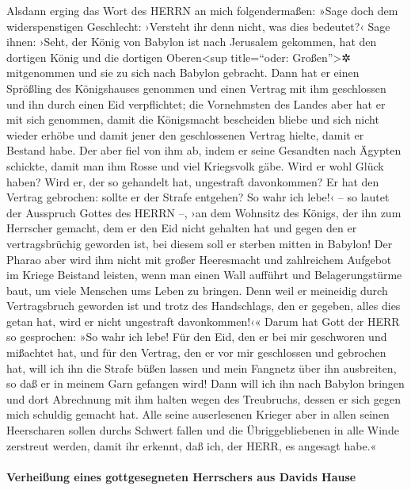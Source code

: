 Alsdann erging das Wort des HERRN an mich folgendermaßen:
»Sage doch dem widerspenstigen Geschlecht: ›Versteht ihr
denn nicht, was dies bedeutet?‹ Sage ihnen: ›Seht, der König von Babylon
ist nach Jerusalem gekommen, hat den dortigen König und die dortigen
Oberen\textless sup title=``oder: Großen''\textgreater✲ mitgenommen und
sie zu sich nach Babylon gebracht. Dann hat er einen
Sprößling des Königshauses genommen und einen Vertrag mit ihm
geschlossen und ihn durch einen Eid verpflichtet; die Vornehmsten des
Landes aber hat er mit sich genommen, damit die
Königsmacht bescheiden bliebe und sich nicht wieder erhöbe und damit
jener den geschlossenen Vertrag hielte, damit er Bestand habe.
Der aber fiel von ihm ab, indem er seine Gesandten nach
Ägypten schickte, damit man ihm Rosse und viel Kriegsvolk gäbe. Wird er
wohl Glück haben? Wird er, der so gehandelt hat, ungestraft davonkommen?
Er hat den Vertrag gebrochen: sollte er der Strafe entgehen?
So wahr ich lebe!‹ -- so lautet der Ausspruch Gottes des
HERRN --, ›an dem Wohnsitz des Königs, der ihn zum Herrscher gemacht,
dem er den Eid nicht gehalten hat und gegen den er vertragsbrüchig
geworden ist, bei diesem soll er sterben mitten in Babylon!
Der Pharao aber wird ihm nicht mit großer Heeresmacht und
zahlreichem Aufgebot im Kriege Beistand leisten, wenn man einen Wall
aufführt und Belagerungstürme baut, um viele Menschen ums Leben zu
bringen. Denn weil er meineidig durch Vertragsbruch
geworden ist und trotz des Handschlags, den er gegeben, alles dies getan
hat, wird er nicht ungestraft davonkommen!‹« Darum hat
Gott der HERR so gesprochen: »So wahr ich lebe! Für den Eid, den er bei
mir geschworen und mißachtet hat, und für den Vertrag, den er vor mir
geschlossen und gebrochen hat, will ich ihn die Strafe büßen lassen
und mein Fangnetz über ihn ausbreiten, so daß er in
meinem Garn gefangen wird! Dann will ich ihn nach Babylon bringen und
dort Abrechnung mit ihm halten wegen des Treubruchs, dessen er sich
gegen mich schuldig gemacht hat. Alle seine auserlesenen
Krieger aber in allen seinen Heerscharen sollen durchs Schwert fallen
und die Übriggebliebenen in alle Winde zerstreut werden, damit ihr
erkennt, daß ich, der HERR, es angesagt habe.«

\hypertarget{verheiuxdfung-eines-gottgesegneten-herrschers-aus-davids-hause}{%
\paragraph{Verheißung eines gottgesegneten Herrschers aus Davids
Hause}\label{verheiuxdfung-eines-gottgesegneten-herrschers-aus-davids-hause}}

